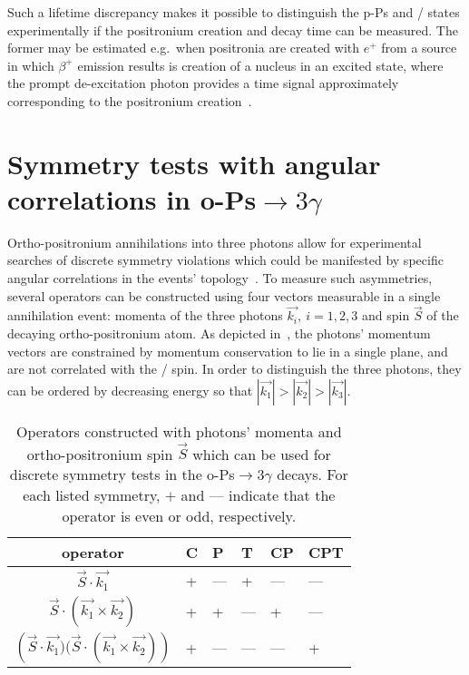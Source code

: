 Such a lifetime discrepancy makes it possible to distinguish the p-Ps and \ops/ states experimentally if the positronium creation and decay time can be measured. The former may be estimated e.g.\ when positronia are created with $e^+$ from a source in which $\beta^+$ emission results is creation of a nucleus in an excited state, where the prompt de-excitation photon provides a time signal approximately corresponding to the positronium creation~\cite{daria_epjc}.

\section{Symmetry tests with angular correlations in o-Ps$\to 3\gamma$}
\label{sec:ops_operators}
Ortho-positronium annihilations into three photons allow for experimental searches of discrete symmetry violations which could be manifested by specific angular correlations in the events' topology~\cite{Bernreuther:1988tt}. To measure such asymmetries, several operators can be constructed using four vectors measurable in a single annihilation event: momenta of the three photons $\vec{k_i},\ i=1,2,3$ and spin $\vec{S}$ of the decaying ortho-positronium atom. As depicted in~, the photons' momentum vectors are constrained by momentum conservation to lie in a single plane, and are not correlated with the \ops/ spin. In order to distinguish the three photons, they can be ordered by decreasing energy so that $|\vec{k_1}| > |\vec{k_2}| > |\vec{k_3}|$.

\begin{table}
  \centering
  \caption{Operators constructed with photons' momenta and ortho-positronium spin $\vec{S}$ which can be used for discrete symmetry tests in the o-Ps$\to 3\gamma$ decays. For each listed symmetry, $+$ and --- indicate that the operator is even or odd, respectively.\label{tab:jpet_operators}}
  \begin{tabular}[h!]{cp{3em}p{3em}p{3em}p{3em}p{3em}}
    \toprule
    operator & C & P & T & CP & CPT \\
    \midrule
    ${\vec{S} \cdot \vec{k_1}}$ & + & --- & + & --- & ---\\      
    ${\vec{S} \cdot (\vec{k_1}\times\vec{k_2})}$ & + & + & --- & + & ---\\
    $({\vec{S} \cdot \vec{k_1})(\vec{S} \cdot (\vec{k_1}\times\vec{k_2})})$ & + & --- & --- & --- & +\\
    \bottomrule
  \end{tabular}
\end{table}

